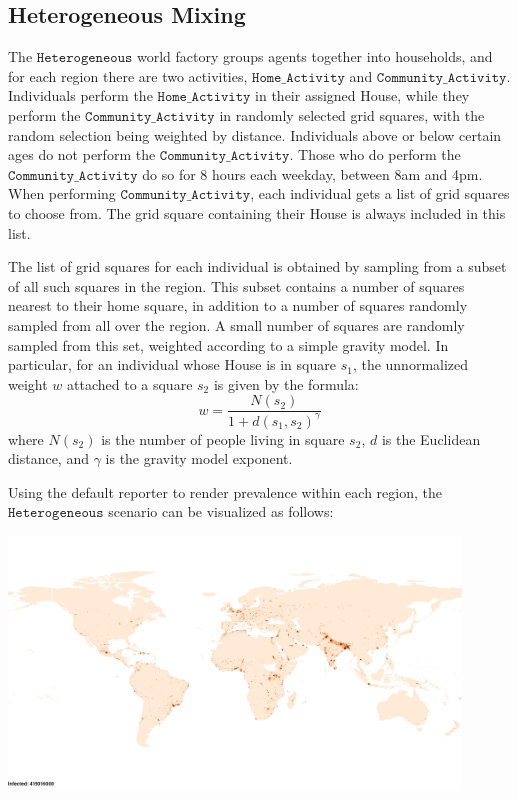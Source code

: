 \documentclass[10pt,letterpaper]{article}
\begin{document}
\subsection{Heterogeneous Mixing}

The $\texttt{Heterogeneous}$ world factory groups agents together into households, and for each region there are two activities, $\texttt{Home{\_}Activity}$ and $\texttt{Community{\_}Activity}$. Individuals perform the
$\texttt{Home{\_}Activity}$ in their assigned House, while they perform the $\texttt{Community{\_}Activity}$ in randomly selected grid squares, with the random selection being weighted by distance. Individuals above or below certain ages do not perform the $\texttt{Community{\_}Activity}$. Those who do perform the $\texttt{Community{\_}Activity}$ do so for 8 hours each weekday, between 8am and 4pm. When performing $\texttt{Community{\_}Activity}$, each individual gets a list of grid squares to choose from. The grid square containing their House is always included in this list.

The list of grid squares for each individual is obtained by sampling from a subset of all such squares in the region. This subset contains a number of squares nearest to their home square, in addition to a number of squares randomly sampled from all over the region. A small number of squares are randomly sampled from this set, weighted according to a simple gravity model. In particular, for an individual whose House is in square $s_1$, the unnormalized weight $w$ attached to a square $s_2$ is given by the formula:
\begin{equation}
w = \frac{N(s_2)}{1 + d(s_1, s_2)^\gamma} \nonumber
\end{equation}
where $N(s_2)$ is the number of people living in square $s_2$, $d$ is the Euclidean distance, and $\gamma$ is the gravity model exponent.

Using the default reporter to render prevalence within each region, the $\texttt{Heterogeneous}$ scenario can be visualized as follows:

\begin{center}
\includegraphics[width=0.9\textwidth]{heterogeneous}
\end{center}
\end{document}
